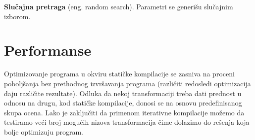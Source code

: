 \documentclass[a4paper]{article}
\begin{document}
\textbf{Slučajna pretraga} (eng. random search). Parametri se generišu slučajnim izborom.

\section{Performanse}
\label{sec:performanse}
Optimizovanje programa u okviru statičke kompilacije se zasniva na proceni poboljšanja 
bez prethodnog izvršavanja programa (različiti redosledi optimizacija daju različite rezultate). 
Odluka da nekoj transformaciji treba dati prednost u odnosu na drugu, kod statičke kompilacije,
donosi se na osnovu predefinisanog skupa ocena. Lako je zaključiti da primenom iterativne kompilacije 
možemo da testiramo veći broj mogućih nizova transformacija čime dolazimo do rešenja koja bolje optimizuju
program.
\end{document}
